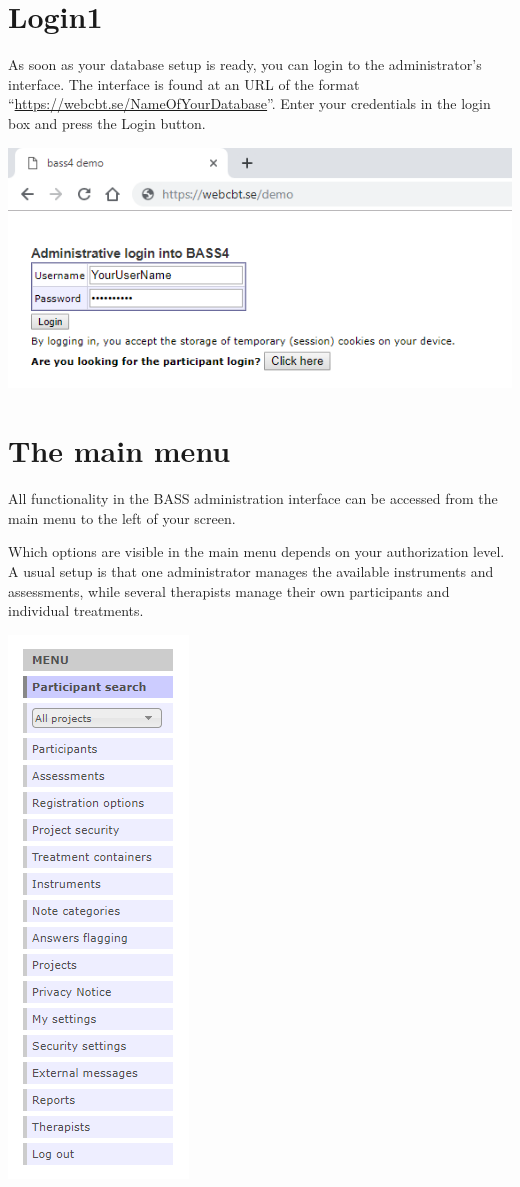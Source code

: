 \documentclass[]{book}
\begin{document}
\hypertarget{login1}{%
\chapter{Login1}\label{login1}}

As soon as your database setup is ready, you can login to the administrator's interface. The interface is found at an URL of the format ``\url{https://webcbt.se/NameOfYourDatabase}''. Enter your credentials in the login box and press the Login button.

\includegraphics{images/login.png}

\hypertarget{the-main-menu}{%
\chapter{The main menu}\label{the-main-menu}}

All functionality in the BASS administration interface can be accessed from the main menu to the left of your screen.

Which options are visible in the main menu depends on your authorization level. A usual setup is that one administrator manages the available instruments and assessments, while several therapists manage their own participants and individual treatments.

\includegraphics{images/main-menu.png}
\end{document}
